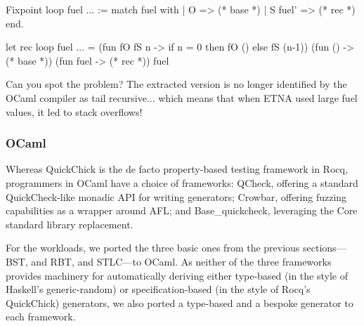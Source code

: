 \smallskip
\noindent
\begin{minipage}{0.33\textwidth}
  \begin{code}
Fixpoint loop fuel ... :=
  match fuel with
  | O => (* base *)
  | S fuel' => (* rec *)
  end.
\end{code}
\end{minipage}
\quad \quad \quad
\begin{minipage}{0.5\textwidth}
  \begin{code}
let rec loop fuel ... = (fun fO fS n ->
  if n = 0 then fO () else fS (n-1))
    (fun () -> (* base *))
    (fun fuel -> (* rec *))
    fuel
\end{code}
\end{minipage}
\smallskip

\noindent
Can you spot the problem? The extracted version is no longer
identified by the OCaml compiler as tail recursive... which means that
when ETNA used large fuel values, it led to stack overflows!

\subsubsection{OCaml}\label{evaluating-generators-ocaml}

Whereas QuickChick is the de facto property-based testing framework in Rocq,
programmers in OCaml have a choice of frameworks: QCheck, offering a standard
QuickCheck-like monadic API for writing generators; Crowbar, offering fuzzing
capabilities as a wrapper around AFL; and Base\_quickcheck, leveraging the Core
standard library replacement.

For the workloads, we ported the three basic ones from the previous sections---BST, and
RBT, and STLC---to OCaml. As neither of the three frameworks provides machinery for
automatically deriving either type-based (in the style of Haskell's generic-random) or
specification-based (in the style of Rocq's QuickChick) generators, we also ported a
type-based and a bespoke generator to each framework.

